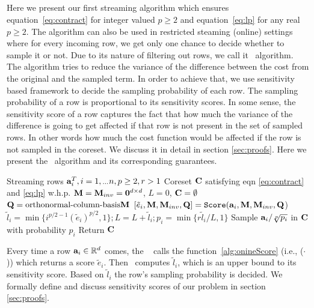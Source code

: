 \subsection{\online}
Here we present our first streaming algorithm which ensures equation~\eqref{eq:contract} for integer valued $p \geq 2$ and equation~\eqref{eq:lp} for any real $p \geq 2$. The algorithm can also be used in restricted steaming (online) settings where for every incoming row, we get only one chance to decide whether to sample it or not. Due to its nature of filtering out rows, we call it \online~algorithm. The algorithm tries to reduce the variance of the difference between the cost from the original and the sampled term. In order to achieve that, we use sensitivity based framework to decide the sampling probability of each row. The sampling probability of a row is proportional to its sensitivity scores. In some sense, the sensitivity score of a row captures the fact that how much the variance of the difference is going to get affected if that row is not present in the set of sampled rows. In other words how much the cost function would be affected if the row is not sampled in the coreset. We discuss it in detail in section \ref{sec:proofs}.
Here we present the \online~algorithm and its corresponding guarantees. 
\begin{algorithm}[htpb]
\caption{\online~}{\label{alg:onlineCoreset}}
\begin{algorithmic}
\REQUIRE Streaming rows $\mathbf{a}_{i}^T, i = 1, {}_{\cdots} n, p \geq 2, r > 1$
\ENSURE Coreset $\mathbf{C}$ satisfying eqn \eqref{eq:contract} and \eqref{eq:lp} w.h.p.
\STATE $\mathbf{M} = \mathbf{M}_{inv} = \mathbf{0}^{d \times d}$, $L=0$, $\mathbf{C}= \emptyset$
\STATE $\mathbf{Q} =  \mbox{orthonormal-column-basis}\mathbf{M}$
\STATE $[\tilde{e}_{i}, \mathbf{M}, \mathbf{M}_{inv}, \mathbf{Q}] = {\texttt{Score}}(\mathbf{a}_{i},\mathbf{M}, \mathbf{M}_{inv}, \mathbf{Q}$)
\STATE $\tilde{l}_{i} = \min\{i^{p/2-1}(\tilde{e}_{i})^{p/2},1\}; L = L+\tilde{l}_{i}; p_{i} = \min\{r\tilde{l}_{i}/L,1\}$
\STATE Sample $\mathbf{a}_{i}/\sqrt[p]{p_{i}}$ in $\mathbf{C}$ with probability $p_{i}$
\ENDWHILE
\STATE Return $\mathbf{C}$
\end{algorithmic}
\end{algorithm}

Every time a row $\mathbf{a}_{i} \in \mathbb{R}^{d}$ comes, the \online~ calls the function~\ref{alg:onineScore} (i.e., \oscore($\cdot$)) which returns a score $\tilde{e}_{i}$. Then \online~computes $\tilde{l}_{i}$, which is an upper bound to its sensitivity score. Based on $\tilde{l}_{i}$ the row's sampling probability is decided. We formally define and discuss sensitivity scores of our problem in section \ref{sec:proofs}.


